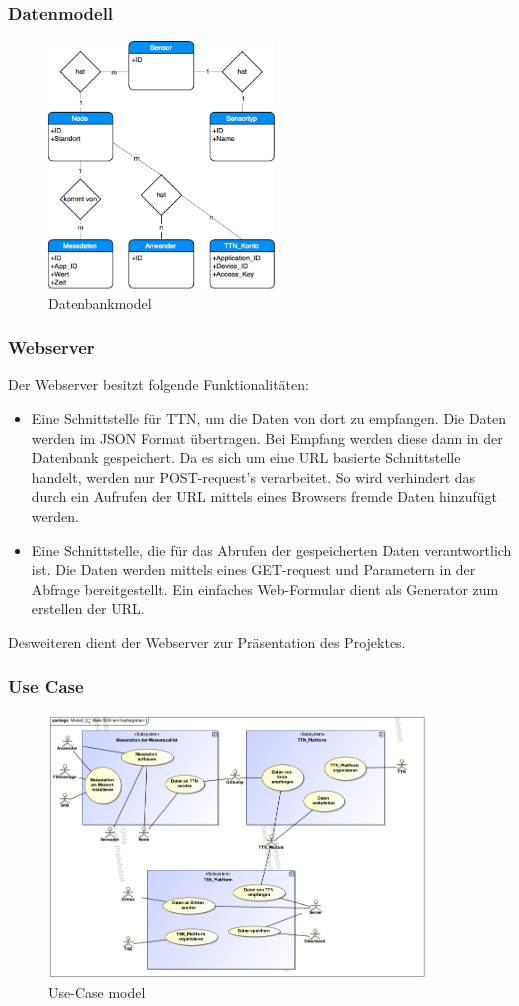 \subsubsection{Datenmodell}
\begin{figure}[H]
	\centering
	\includegraphics[width=6cm]{figures/dbmodel.png}
	\caption{Datenbankmodel}
	\label{fig:dbModel}
\end{figure}

\subsubsection{Webserver}
Der Webserver besitzt folgende Funktionalitäten:
\begin{itemize}
	\item Eine Schnittstelle für TTN, um die Daten von dort zu empfangen. Die Daten werden im JSON Format übertragen.
		  Bei Empfang werden diese dann in der Datenbank gespeichert. Da es sich um eine URL basierte Schnittstelle handelt, werden nur POST-request's verarbeitet.
		  So wird verhindert das durch ein Aufrufen der URL mittels eines Browsers fremde Daten hinzufügt werden.
	  \item Eine Schnittstelle, die f\"ur das Abrufen der gespeicherten Daten verantwortlich ist. Die Daten werden mittels eines GET-request und Parametern in der Abfrage bereitgestellt. Ein einfaches Web-Formular dient als Generator zum erstellen der URL.
\end{itemize}
Desweiteren dient der Webserver zur Präsentation des Projektes.

\subsubsection{Use Case}
\begin{figure}[H]
	\centering
	\includegraphics[width=10cm]{figures/use-case.png}
	\caption{Use-Case model}
	\label{fig:useCase}
\end{figure}
